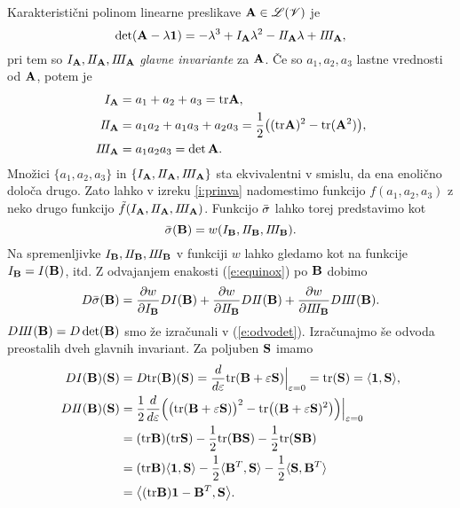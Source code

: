 Karakteristični polinom linearne preslikave $\mathbf A\in\mathscr L(\mathscr V)$ je
\[
	\det(\mathbf A-\lambda\mathbf 1)=-\lambda^3+I_{\mathbf A}\lambda^2-I\! I_{\mathbf A}\lambda+I\! I\! I_{\mathbf A},
\]
pri tem so $I_{\mathbf A}, I\! I_{\mathbf A}, I\! I\! I_{\mathbf A}$ \emph{glavne invariante} za $\mathbf A$.
Če so $a_1,a_2,a_3$ lastne vrednosti od $\mathbf A$, potem je
\begin{align*}
	I_{\mathbf A}&=a_1+a_2+a_3=\mathrm{tr}\mathbf A,\\
	I\! I_{\mathbf A}&=a_1a_2+a_1a_3+a_2a_3=\frac{1}{2}\big((\mathrm{tr}\mathbf A)^2-\mathrm{tr}(\mathbf A^2)\big),\\
	I\! I\! I_{\mathbf A}&=a_1a_2a_3=\det\mathbf A.
\end{align*}
Množici $\{a_1,a_2,a_3\}$ in $\{I_{\mathbf A},I\! I_{\mathbf A},I\! I\! I_{\mathbf A}\}$ sta ekvivalentni
v smislu, da ena enoli\-čno določa drugo. Zato lahko v izreku \ref{i:prinva} nadomestimo
funkcijo $f(a_1,a_2,a_3)$ z neko drugo funkcijo $\tilde{f}(I_{\mathbf A},I\! I_{\mathbf A},I\! I\! I_{\mathbf A})$.
Funkcijo $\bar{\sigma}$ lahko torej predstavimo kot
\begin{equation} \label{e:equinox}
	\bar{\sigma}(\mathbf B)=w(I_{\mathbf B},I\! I_{\mathbf B},I\! I\! I_{\mathbf B}).
\end{equation}
Na spremenljivke $I_{\mathbf B},I\! I_{\mathbf B},I\! I\! I_{\mathbf B}$ v funkciji $w$ lahko gledamo kot
na funkcije $I_{\mathbf B}=I(\mathbf B)$, itd. Z odvajanjem enakosti (\ref{e:equinox}) po $\mathbf B$ dobimo
\begin{equation} \label{e:dbshy}
	D\bar{\sigma}(\mathbf B)=\frac{\partial w}{\partial I_{\mathbf B}}DI(\mathbf B)+
	\frac{\partial w}{\partial I\! I_{\mathbf B}}DI\! I(\mathbf B)+
	\frac{\partial w}{\partial I\! I\! I_{\mathbf B}}DI\! I\! I(\mathbf B).
\end{equation}
$DI\! I\! I(\mathbf B)=D\det(\mathbf B)$ smo že izračunali v (\ref{e:odvodet}). Izračunajmo še
odvoda preostalih dveh glavnih invariant. Za poljuben $\mathbf S$ imamo
\begin{align*}
	DI(\mathbf B)(\mathbf S)&=D\mathrm{tr}(\mathbf B)(\mathbf S)=
	\frac{d}{d\varepsilon}\mathrm{tr}(\mathbf B+\varepsilon\mathbf S)\Big|_{\varepsilon=0}=
	\mathrm{tr}(\mathbf S)=\langle\mathbf 1,\mathbf S\rangle,\\
	DI\! I(\mathbf B)(\mathbf S)&=
	\frac{1}{2}\frac{d}{d\varepsilon}\Big(
	\big(\mathrm{tr}(\mathbf B+\varepsilon\mathbf S)\big)^2-\mathrm{tr}\big((\mathbf B+\varepsilon\mathbf S)^2\big)
	\Big)\Big|_{\varepsilon=0}\\
	&=(\mathrm{tr}\mathbf B)(\mathrm{tr}\mathbf S)-\frac{1}{2}\mathrm{tr}(\mathbf B\mathbf S)-\frac{1}{2}\mathrm{tr}(\mathbf S\mathbf B)\\
	&=(\mathrm{tr}\mathbf B)\langle\mathbf 1,\mathbf S\rangle-\frac{1}{2}\langle\mathbf B^T,\mathbf S\rangle
	-\frac{1}{2}\langle\mathbf S,\mathbf B^T\rangle\\
	&=\big<(\mathrm{tr}\mathbf B)\mathbf 1-\mathbf B^T,\mathbf S\big>.
\end{align*}

